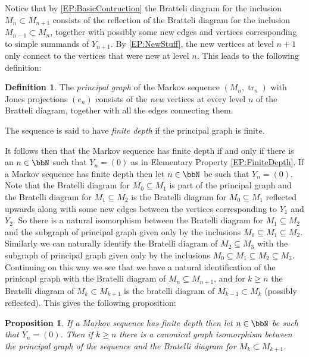 \documentclass[11pt]{article}
\theoremstyle{plain}
\newtheorem{prop}[thm]{Proposition}
\theoremstyle{definition}
\newtheorem{defn}[thm]{Definition}
\DeclareMathOperator{\tr}{tr}
\begin{document}
Notice that by \ref{EP:BasicContruction} the Bratteli diagram for the inclusion $M_{n}\subset M_{n+1}$ consists of the reflection of the Bratteli diagram for the inclusion $M_{n-1} \subset M_n$, together with possibly some new edges and vertices corresponding to simple summands of $Y_{n+1}$. By \ref{EP:NewStuff}, the new vertices at level $n+1$ only connect to the vertices that were new at level $n$. This leads to the following definition:


\begin{defn}
The \emph{principal graph} of the Markov sequence $(M_n,\tr_n)$ with Jones projections $(e_n)$ consists of the \emph{new} vertices at every level $n$ of the Bratteli diagram, together with all the edges connecting them.

The sequence is said to have \emph{finite depth} if the principal graph is finite.
\end{defn}


It follows then that the Markov sequence has finite depth if and only if there is an $n\in \bbN$ such that $Y_n = (0)$ as in Elementary Property \eqref{EP:FiniteDepth}. If a Markov sequence has finite depth then let $n\in \bbN$ be such that $Y_n=(0)$. Note that the Bratelli diagram for $M_0\subseteq M_1$ is part of the principal graph and the Bratelli diagram for $M_1\subseteq M_2$ is the Bratelli diagram for $M_0\subseteq M_1$ reflected upwards along with some new edges between the vertices corresponding to $Y_1$ and $Y_2$. So there is a natural isomorphism between the Bratelli diagram for $M_1\subseteq M_2$ and the subgraph of principal graph given only by the inclusions $M_0\subseteq M_1\subseteq M_2$. Similarly we can naturally identify the Bratelli diagram of $M_2\subseteq M_3$ with the subgraph of principal graph given only by the inclusions $M_0\subseteq M_1\subseteq M_2\subseteq M_3$. Continuing on this way we see that we have a natural identification of the prinicapl graph with the Bratelli diagram of $M_n\subseteq M_{n+1}$, and for $k\geq n$ the Bratelli diagram of $M_{k}\subset M_{k+1}$ is the bratelli diagram of $M_{k-1}\subset M_{k}$ (possibly reflected). This gives the following proposition:

\begin{prop}
If a Markov sequence has finite depth then let $n\in \bbN$ be such that $Y_n=(0)$. Then if $k\geq n$ there is a canonical graph isomorphism between the principal graph of the sequence and the Bratelli diagram for $M_{k}\subset M_{k+1}$.
\end{prop}
\end{document}
